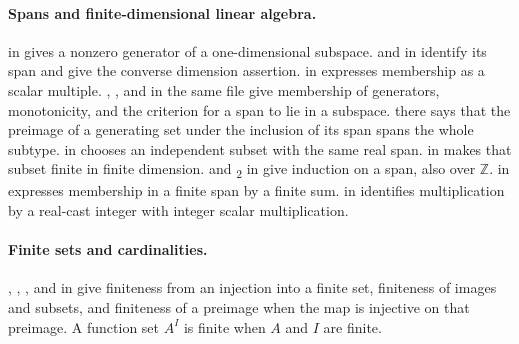 \documentclass[11pt]{amsart}
\newcommand\ints{{\mathbb Z}}
\begin{document}
\paragraph{Spans and finite-dimensional linear algebra.}\label{facts:312-linear}\uses{}
\begingroup\raggedright
{} in
gives a nonzero generator of a one-dimensional subspace.
 and
 in
identify its span and give the converse dimension assertion.
 in
 expresses membership as a scalar multiple.
, , and
 in the same file give membership of generators,
monotonicity, and the criterion for a span to lie in a subspace.
 there says that the preimage of
a generating set under the inclusion of its span spans the whole subtype.
 in
chooses an independent subset with the same real span.
 in
makes that subset finite in finite dimension.
 and \textsubscript{2} in
give induction on a span, also over $\ints$.
 in
expresses membership in a finite span by a finite sum.
 in
 identifies multiplication by
a real-cast integer with integer scalar multiplication.
\par\endgroup

\paragraph{Finite sets and cardinalities.}\label{facts:312-finite}\uses{}
\begingroup\raggedright
{}, ,
, and  in
 give finiteness from an
injection into a finite set, finiteness of images and subsets, and
finiteness of a preimage when the map is injective on that preimage.
A function set $A^I$ is finite when $A$ and $I$ are finite.
\par\endgroup
\end{document}
